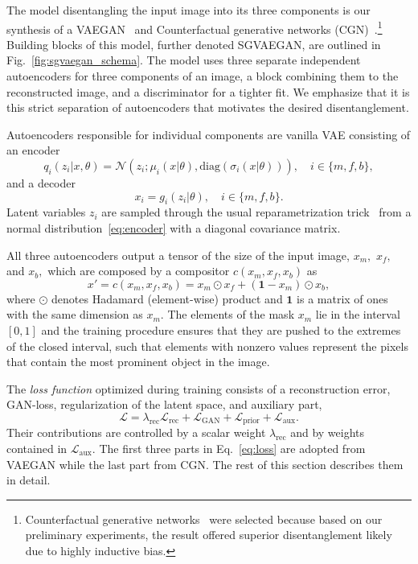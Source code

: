 The model disentangling the input image into its three components is our synthesis of a VAEGAN~\cite{larsen2016autoencoding} and Counterfactual generative networks (CGN)~\cite{sauer2021counterfactual}.\footnote{Counterfactual generative networks~\cite{sauer2021counterfactual} were selected because based on our preliminary experiments, the result offered superior disentanglement likely due to highly inductive bias.} Building blocks of this model, further denoted SGVAEGAN, are outlined in Fig.~\ref{fig:sgvaegan_schema}. The model uses three separate independent autoencoders for three components of an image, a block combining them to the reconstructed image, and a discriminator for a tighter fit. We emphasize that it is this strict separation of autoencoders that motivates the desired disentanglement.

Autoencoders responsible for individual components are vanilla VAE consisting of an encoder
\begin{equation} \label{eq:encoder}
    q_{i}(z_i \vert x, \theta) = \mathcal{N} \left(z_i; \mu_i(x\vert\theta), \text{diag}(\sigma_i(x\vert\theta)) \right),\quad i \in \lbrace m, f, b \rbrace,
\end{equation}
 and a decoder 
\begin{equation} \label{eq:decoder}
    x_i = g_i (z_i\vert\theta),\quad i \in \lbrace m, f, b \rbrace.
\end{equation}
Latent variables $z_i$ are sampled through the usual reparametrization trick~\cite{kingma2013vae} from a normal distribution~\eqref{eq:encoder} with a diagonal covariance matrix.

All three autoencoders output a tensor of the size of the input image, $x_m,$ $x_f,$ and $x_b,$ which are composed by a compositor $c(x_m,x_f,x_b)$ as
\begin{equation}
    x' = c(x_m,x_f,x_b) = x_m \odot x_f + (\mathbf{1} - x_m) \odot x_b, \label{eq:composition}
\end{equation}
where $\odot$ denotes Hadamard (element-wise) product and $\mathbf{1}$ is a matrix of ones with the same dimension as $x_m.$ The elements of the mask $x_m$ lie in the interval $[0,1]$ and the training procedure ensures that they are pushed to the extremes of the closed interval, such that elements with nonzero values represent the pixels that contain the most prominent object in the image. 

The \emph{loss function} optimized during training consists of a reconstruction error, GAN-loss, regularization of the latent space, and auxiliary part, 
\begin{equation}
    \mathcal{L} = \lambda_{\text{rec}}\mathcal{L}_{\text{rec}} + \mathcal{L}_{\text{GAN}} +  \mathcal{L}_{\text{prior}} + \mathcal{L}_{\text{aux}}.
    \label{eq:loss}
\end{equation}
Their contributions are controlled by a scalar weight $\lambda_{\text{rec}}$ and by weights contained in $\mathcal{L}_{\text{aux}}.$ The first three parts in Eq.~\eqref{eq:loss} are adopted from VAEGAN while the last part from CGN. The rest of this section describes them in detail.

